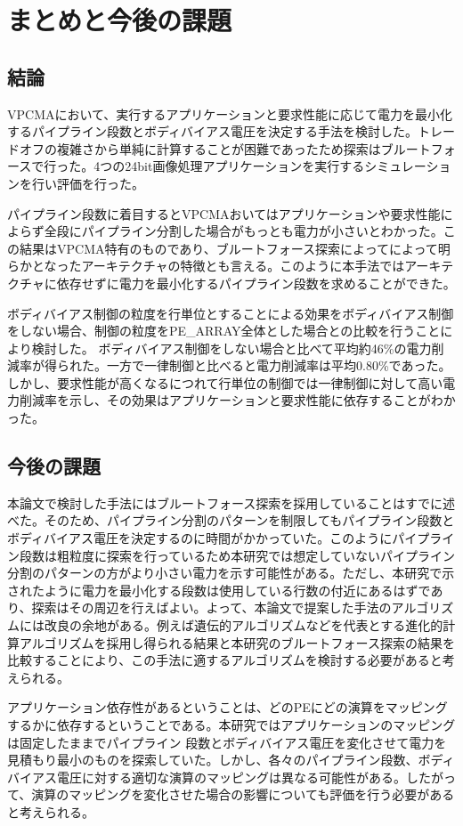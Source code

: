 \chapter{まとめと今後の課題}
{
\label{chap:conclusion}
\section{結論}
\label{sec:conclusion}
VPCMAにおいて、実行するアプリケーションと要求性能に応じて電力を最小化するパイプライン段数とボディバイアス電圧を決定する手法を検討した。トレードオフの複雑さから単純に計算することが困難であったため探索はブルートフォースで行った。4つの24bit画像処理アプリケーションを実行するシミュレーションを行い評価を行った。

パイプライン段数に着目するとVPCMAおいてはアプリケーションや要求性能によらず全段にパイプライン分割した場合がもっとも電力が小さいとわかった。この結果はVPCMA特有のものであり、ブルートフォース探索によってによって明らかとなったアーキテクチャの特徴とも言える。このように本手法ではアーキテクチャに依存せずに電力を最小化するパイプライン段数を求めることができた。

ボディバイアス制御の粒度を行単位とすることによる効果をボディバイアス制御をしない場合、制御の粒度をPE\_ARRAY全体とした場合との比較を行うことにより検討した。
ボディバイアス制御をしない場合と比べて平均約46\%の電力削減率が得られた。一方で一律制御と比べると電力削減率は平均0.80\%であった。しかし、要求性能が高くなるにつれて行単位の制御では一律制御に対して高い電力削減率を示し、その効果はアプリケーションと要求性能に依存することがわかった。

\section{今後の課題}
\label{sec:future}

本論文で検討した手法にはブルートフォース探索を採用していることはすでに述べた。そのため、パイプライン分割のパターンを制限してもパイプライン段数とボディバイアス電圧を決定するのに時間がかかっていた。このようにパイプライン段数は粗粒度に探索を行っているため本研究では想定していないパイプライン分割のパターンの方がより小さい電力を示す可能性がある。ただし、本研究で示されたように電力を最小化する段数は使用している行数の付近にあるはずであり、探索はその周辺を行えばよい。よって、本論文で提案した手法のアルゴリズムには改良の余地がある。例えば遺伝的アルゴリズムなどを代表とする進化的計算アルゴリズムを採用し得られる結果と本研究のブルートフォース探索の結果を比較することにより、この手法に適するアルゴリズムを検討する必要があると考えられる。

アプリケーション依存性があるということは、どのPEにどの演算をマッピングするかに依存するということである。本研究ではアプリケーションのマッピングは固定したままでパイプライン
段数とボディバイアス電圧を変化させて電力を見積もり最小のものを探索していた。しかし、各々のパイプライン段数、ボディバイアス電圧に対する適切な演算のマッピングは異なる可能性がある。したがって、演算のマッピングを変化させた場合の影響についても評価を行う必要があると考えられる。
}
